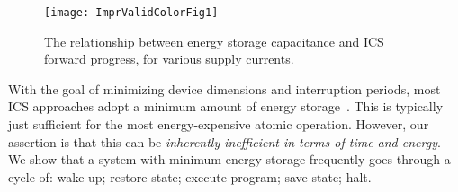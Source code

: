 

\begin{figure}[!t]
    \centering
    \texttt{[image: ImprValidColorFig1]}
    \caption{The relationship between energy storage capacitance and ICS forward progress, for various supply currents. }
    \label{fig:imprvalid1}
\end{figure}


With the goal of minimizing device dimensions and interruption periods, most ICS approaches adopt a minimum amount of energy storage~\cite{7442814, 10.1145/2700249, 10.1145/2809695.2809707, 10.1145/3281300, 222579}. This is typically just sufficient for the most energy-expensive atomic operation. 
However, our assertion is that this can be \textit{inherently inefficient in terms of time and energy}. We show that a system with minimum energy storage frequently goes through a cycle of: wake up; restore state; execute program; save state; halt.

